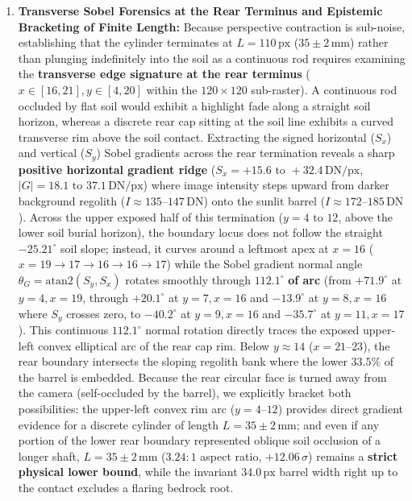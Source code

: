 \documentclass[11pt,a4paper]{article}
\begin{document}
\begin{enumerate}
	\item \textbf{Transverse Sobel Forensics at the Rear Terminus and Epistemic Bracketing of Finite Length:} Because perspective contraction is sub-noise, establishing that the cylinder terminates at $L = 110\,\text{px}$ ($35 \pm 2\,\text{mm}$) rather than plunging indefinitely into the soil as a continuous rod requires examining the \textbf{transverse edge signature at the rear terminus} ($x \in [16, 21], y \in [4, 20]$ within the $120 \times 120$ sub-raster). A continuous rod occluded by flat soil would exhibit a highlight fade along a straight soil horizon, whereas a discrete rear cap sitting at the soil line exhibits a curved transverse rim above the soil contact. Extracting the signed horizontal ($S_x$) and vertical ($S_y$) Sobel gradients across the rear termination reveals a sharp \textbf{positive horizontal gradient ridge} ($S_x = +15.6\text{ to }+32.4\,\text{DN/px}$, $|G| = 18.1\text{ to }37.1\,\text{DN/px}$) where image intensity steps upward from darker background regolith ($I \approx 135\text{--}147\,\text{DN}$) onto the sunlit barrel ($I \approx 172\text{--}185\,\text{DN}$). Across the upper exposed half of this termination ($y = 4\text{ to }12$, above the lower soil burial horizon), the boundary locus does not follow the straight $-25.21^\circ$ soil slope; instead, it curves around a leftmost apex at $x = 16$ ($x = 19 \to 17 \to 16 \to 16 \to 17$) while the Sobel gradient normal angle $\theta_G = \text{atan2}(S_y, S_x)$ rotates smoothly through $\mathbf{112.1^\circ}$ \textbf{of arc} (from $+71.9^\circ$ at $y=4, x=19$, through $+20.1^\circ$ at $y=7, x=16$ and $-13.9^\circ$ at $y=8, x=16$ where $S_y$ crosses zero, to $-40.2^\circ$ at $y=9, x=16$ and $-35.7^\circ$ at $y=11, x=17$). This continuous $112.1^\circ$ normal rotation directly traces the exposed upper-left convex elliptical arc of the rear cap rim. Below $y \approx 14$ ($x = 21\text{--}23$), the rear boundary intersects the sloping regolith bank where the lower $33.5\%$ of the barrel is embedded. Because the rear circular face is turned away from the camera (self-occluded by the barrel), we explicitly bracket both possibilities: the upper-left convex rim arc ($y = 4\text{--}12$) provides direct gradient evidence for a discrete cylinder of length $L = 35 \pm 2\,\text{mm}$; and even if any portion of the lower rear boundary represented oblique soil occlusion of a longer shaft, $L = 35 \pm 2\,\text{mm}$ ($3.24:1$ aspect ratio, $+12.06\,\sigma$) remains a \textbf{strict physical lower bound}, while the invariant $34.0\,\text{px}$ barrel width right up to the contact excludes a flaring bedrock root.
\end{enumerate}
\end{document}
